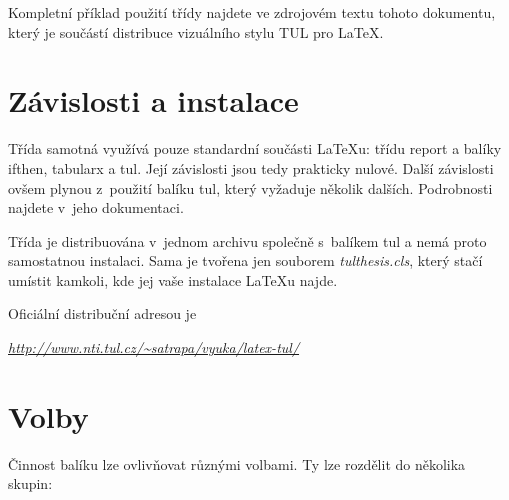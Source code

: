 \documentclass[FM,DP]{tulthesis}
\newcommand{\argument}[1]{{\ttfamily\color{\tulcolor}#1}}
\newenvironment{myquote}{\begin{list}{}{\setlength\leftmargin\parindent}\item[]}{\end{list}}
\newenvironment{listing}{\begin{myquote}\color{\tulcolor}}{\end{myquote}}
\begin{document}
Kompletní příklad použití třídy najdete ve zdrojovém textu tohoto dokumentu,
který je součástí distribuce vizuálního stylu TUL pro \LaTeX.


\chapter{Závislosti a instalace}

Třída samotná využívá pouze standardní součásti \LaTeX u: třídu
\argument{report} a balíky \argument{ifthen}, \argument{tabularx} a
\argument{tul}. Její závislosti jsou tedy prakticky nulové. Další závislosti
ovšem plynou z~použití balíku \argument{tul}, který vyžaduje několik dalších.
Podrobnosti najdete v~jeho dokumentaci.

Třída je distribuována v~jednom archivu společně s~balíkem \argument{tul} a
nemá proto samostatnou instalaci. Sama je tvořena jen souborem
\emph{tulthesis.cls}, který stačí umístit kamkoli, kde jej vaše instalace
\LaTeX u najde. 

Oficiální distribuční adresou je

\begin{listing}
\href{http://www.nti.tul.cz/~satrapa/vyuka/latex-tul/}{\emph{http://www.nti.tul.cz/\textasciitilde satrapa/vyuka/latex-tul/}}
\end{listing}


\chapter{Volby}

Činnost balíku lze ovlivňovat různými volbami. Ty lze rozdělit do několika
skupin:
\end{document}
